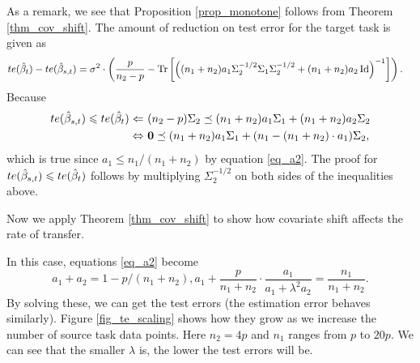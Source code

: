 As a remark, we see that Proposition \ref{prop_monotone} follows from Theorem \ref{thm_cov_shift}.
The amount of reduction on test error for the target task is given as
	\begin{align*}
		te(\hat{\beta}_t) - te(\hat{\beta}_{s,t})
		&= \sigma^2 \cdot \left({\frac p {n_2 - p} -  \operatorname{Tr}\left[\left({(n_1 + n_2)a_1\Sigma_2^{-1/2}\Sigma_1\Sigma_2^{-1/2} + (n_1 + n_2)a_2\operatorname{Id}}\right)^{-1}\right]}\right).
	\end{align*}
Because
\begin{align*}
	te(\hat{\beta}_{s,t}) \leqslant te(\hat{\beta}_t)
	\Leftarrow~ & (n_2 - p)\Sigma_2 \preceq (n_1 + n_2) a_1 \Sigma_1 + (n_1 + n_2)a_2 \Sigma_2 \\
	\Leftrightarrow~ & \mathbf{0} \preceq (n_1 + n_2) a_1 \Sigma_1 + (n_1 - (n_1 + n_2)\cdot a_1) \Sigma_2,
\end{align*}
which is true since $a_1 \le n_1 / (n_1 + n_2)$ by equation \eqref{eq_a2}.
The proof for $te(\hat{\beta}_{s,t}) \leqslant te(\hat{\beta}_t)$ follows by multiplying $\Sigma_2^{-1/2}$ on both sides of the inequalities above.

\medskip
Now we apply Theorem \ref{thm_cov_shift} to show how covariate shift affects the rate of transfer.


\smallskip
\begin{example}[\textbf{When $\Sigma_1 = \Sigma_2 / \lambda$}]
In this case, equations \eqref{eq_a2} become
\[ a_1 + a_2 = 1 - p/(n_1 + n_2), a_1 + \frac{p}{n_1 + n_2} \cdot \frac {a_1} {a_1 + \lambda^2 a_2} = \frac{n_1} {n_1 + n_2}. \]
By solving these, we can get the test errors (the estimation error behaves similarly).
Figure \ref{fig_te_scaling} shows how they grow as we increase the number of source task data points.
Here $n_2 = 4p$ and $n_1$ ranges from $p$ to $20p$.
We can see that the smaller $\lambda$ is, the lower the test errors will be.
\end{example}

